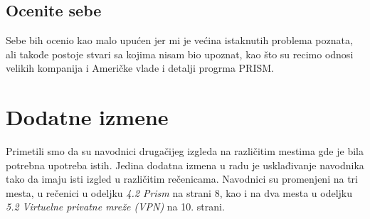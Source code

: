 \documentclass[a4paper]{report}
\begin{document}
\section{Ocenite sebe}
Sebe bih ocenio kao malo upućen jer mi je većina istaknutih problema poznata, ali takođe postoje stvari sa kojima nisam bio upoznat, kao što su recimo odnosi velikih kompanija i Američke vlade i detalji progrma PRISM.

\chapter{Dodatne izmene}
Primetili smo da su navodnici drugačijeg izgleda na različitim mestima gde je bila potrebna upotreba istih. Jedina dodatna izmena u radu je usklađivanje navodnika tako da imaju isti izgled u različitim rečenicama. Navodnici su promenjeni na tri mesta, u rečenici u odeljku \emph{4.2 Prism} na strani 8, kao i na dva mesta u odeljku \emph{5.2 Virtuelne privatne mreže (VPN)} na 10. strani. 
\end{document}
